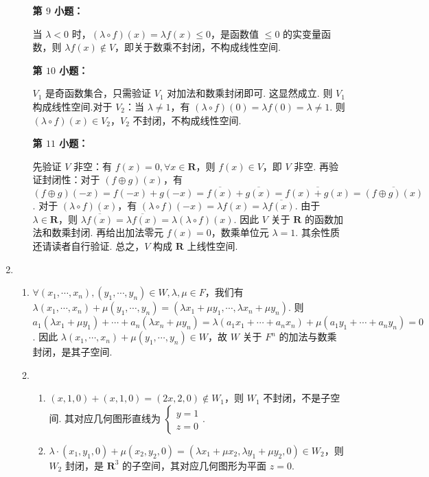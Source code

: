 \begin{enumerate}
\begin{enumerate}
        \textbf{第 $9$ 小题：}

        当 $\lambda<0$ 时，$(\lambda\circ f)(x)=\lambda f(x)\le 0$，是函数值 $\le0$ 的实变量函数，则 $\lambda f(x)\not\in V$，即关于数乘不封闭，不构成线性空间.

        \textbf{第 $10$ 小题：}

        $V_1$ 是奇函数集合，只需验证 $V_1$ 对加法和数乘封闭即可. 这显然成立. 则 $V_1$ 构成线性空间.对于 $V_2$：当 $\lambda\ne 1$，有 $(\lambda\circ f)(0)=\lambda f(0)=\lambda\ne 1$. 则 $(\lambda\circ f)(x)\in V_2$，$V_2$ 不封闭，不构成线性空间.

        \textbf{第 $11$ 小题：}

        先验证 $V$ 非空：有 $f(x)=0,\forall x\in \mathbf{R}$，则 $f(x)\in V$，即 $V$ 非空. 再验证封闭性：对于 $(f\oplus g)(x)$，有 $(f\oplus g)(-x)=f(-x)+g(-x)=\overline{f(x)}+\overline{g(x)}=\overline{f(x)+g(x)}=\overline{(f\oplus g)(x)}$. 对于 $(\lambda\circ f)(x)$，有 $(\lambda\circ f)(-x)=\lambda f(x)=\lambda\overline{f(x)}$. 由于 $\lambda \in \mathbf{R}$，则 $\lambda \overline{f(x)}=\overline{\lambda f(x)}=\lambda{(\lambda\circ f)(x)}$. 因此 $V$ 关于 $\mathbf{R}$ 的函数加法和数乘封闭. 再给出加法零元 $f(x)=0$，数乘单位元 $\lambda=1$. 其余性质还请读者自行验证. 总之，$V$ 构成 $\mathbf{R}$ 上线性空间.
    \end{enumerate}
    \item \begin{enumerate}
        \item $\forall (x_1,\cdots,x_n),(y_1,\cdots,y_n)\in W,\lambda,\mu\in F$，我们有$\lambda(x_1,\cdots,x_n)+\mu(y_1,\cdots,y_n)=(\lambda x_1+\mu y_1,\cdots,\lambda x_n+\mu y_n)$. 则 $a_1(\lambda x_1+\mu y_1)+\cdots+a_n(\lambda x_n+\mu y_n)=\lambda(a_1x_1+\cdots+a_nx_n)+\mu(a_1y_1+\cdots+a_ny_n)=0$. 因此 $\lambda(x_1,\cdots,x_n)+\mu(y_1,\cdots,y_n)\in W$，故 $W$ 关于 $F^n$ 的加法与数乘封闭，是其子空间.

        \item \begin{enumerate}
            \item $(x,1,0)+(x,1,0)=(2x,2,0)\not\in W_1$，则 $W_1$ 不封闭，不是子空间. 其对应几何图形直线为 $\begin{cases}
                y=1 \\ z=0
            \end{cases}$.
            \item $\lambda\cdot(x_1,y_1,0)+\mu(x_2,y_2,0)=(\lambda x_1+\mu x_2,\lambda y_1+\mu y_2,0)\in W_2$，则 $W_2$ 封闭，是 $\mathbf{R}^3$ 的子空间，其对应几何图形为平面 $z=0$.
        \end{enumerate}


\end{enumerate}
\end{enumerate}
